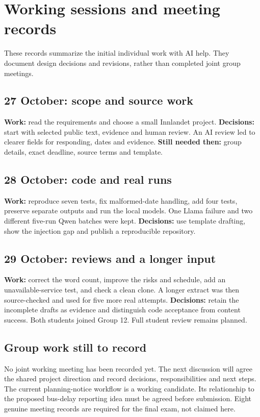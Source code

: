 \documentclass{article}
\begin{document}
\clearpage
\section{Working sessions and meeting records}
These records summarize the initial individual work with AI help. They document
design decisions and revisions, rather than completed joint group meetings.

\subsection{27 October: scope and source work}
\textbf{Work:} read the requirements and choose a small Innlandet project.
\textbf{Decisions:} start with selected public text, evidence and human review.
An AI review led to clearer fields for responding, dates and evidence.
\textbf{Still needed then:} group details, exact deadline, source terms and template.

\subsection{28 October: code and real runs}
\textbf{Work:} reproduce seven tests, fix malformed-date handling, add four tests,
preserve separate outputs and run the local models. One Llama failure and two
different five-run Qwen batches were kept. \textbf{Decisions:} use template drafting,
show the injection gap and publish a reproducible repository.

\subsection{29 October: reviews and a longer input}
\textbf{Work:} correct the word count, improve the risks and schedule, add an
unavailable-service test, and check a clean clone. A longer extract was then
source-checked and used for five more real attempts. \textbf{Decisions:} retain the
incomplete drafts as evidence and distinguish code acceptance from content success.
Both students joined Group 12. Full student review remains planned.

\subsection{Group work still to record}
No joint working meeting has been recorded yet. The next discussion will agree
the shared project direction and record decisions, responsibilities and next steps.
The current planning-notice workflow is a working candidate. Its relationship to
the proposed bus-delay reporting idea must be agreed before submission. Eight
genuine meeting records are required for the final exam, not claimed here.
\end{document}
